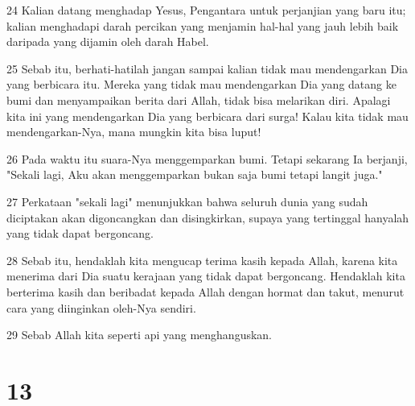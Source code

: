 \par 24 Kalian datang menghadap Yesus, Pengantara untuk perjanjian yang baru itu; kalian menghadapi darah percikan yang menjamin hal-hal yang jauh lebih baik daripada yang dijamin oleh darah Habel.
\par 25 Sebab itu, berhati-hatilah jangan sampai kalian tidak mau mendengarkan Dia yang berbicara itu. Mereka yang tidak mau mendengarkan Dia yang datang ke bumi dan menyampaikan berita dari Allah, tidak bisa melarikan diri. Apalagi kita ini yang mendengarkan Dia yang berbicara dari surga! Kalau kita tidak mau mendengarkan-Nya, mana mungkin kita bisa luput!
\par 26 Pada waktu itu suara-Nya menggemparkan bumi. Tetapi sekarang Ia berjanji, "Sekali lagi, Aku akan menggemparkan bukan saja bumi tetapi langit juga."
\par 27 Perkataan "sekali lagi" menunjukkan bahwa seluruh dunia yang sudah diciptakan akan digoncangkan dan disingkirkan, supaya yang tertinggal hanyalah yang tidak dapat bergoncang.
\par 28 Sebab itu, hendaklah kita mengucap terima kasih kepada Allah, karena kita menerima dari Dia suatu kerajaan yang tidak dapat bergoncang. Hendaklah kita berterima kasih dan beribadat kepada Allah dengan hormat dan takut, menurut cara yang diinginkan oleh-Nya sendiri.
\par 29 Sebab Allah kita seperti api yang menghanguskan.

\chapter{13}

